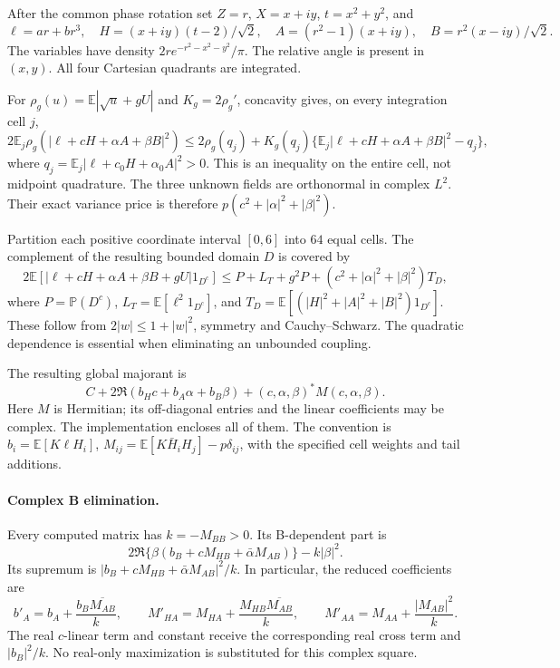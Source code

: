After the common phase rotation set $Z=r$, $X=x+iy$, $t=x^2+y^2$, and
\[
 \ell=ar+br^3,\quad H=(x+iy)(t-2)/\sqrt2,\quad
 A=(r^2-1)(x+iy),\quad B=r^2(x-iy)/\sqrt2.
\]
The variables have density $2r e^{-r^2-x^2-y^2}/\pi$.
The relative angle is present in $(x,y)$. All four Cartesian quadrants
are integrated.

For $\rho_g(u)=\mathbb E|\sqrt u+gU|$ and $K_g=2\rho_g'$, concavity gives,
on every integration cell $j$,
\[
 2\mathbb E_j\rho_g(|\ell+cH+\alpha A+\beta B|^2)
 \le2\rho_g(q_j)+K_g(q_j)
 \{\mathbb E_j|\ell+cH+\alpha A+\beta B|^2-q_j\},
\]
where $q_j=\mathbb E_j|\ell+c_0H+\alpha_0A|^2>0$.
This is an inequality on the entire cell, not midpoint quadrature.
The three unknown fields are orthonormal in complex $L^2$.
Their exact variance price is therefore $p(c^2+|\alpha|^2+|\beta|^2)$.

Partition each positive coordinate interval $[0,6]$ into $64$ equal
cells. The complement of the resulting bounded domain $D$ is covered by
\[
 2\mathbb E[|\ell+cH+\alpha A+\beta B+gU|1_{D^c}]
 \le P+L_T+g^2P+(c^2+|\alpha|^2+|\beta|^2)T_D,
\]
where $P=\mathbb P(D^c)$, $L_T=\mathbb E[\ell^2 1_{D^c}]$, and
$T_D=\mathbb E[(|H|^2+|A|^2+|B|^2)1_{D^c}]$.
These follow from $2|w|\le1+|w|^2$, symmetry and Cauchy--Schwarz.
The quadratic dependence is essential when eliminating an unbounded
coupling.

The resulting global majorant is
\[
 C+2\Re(b_Hc+b_A\alpha+b_B\beta)
 +(c,\alpha,\beta)^*M(c,\alpha,\beta).
\]
Here $M$ is Hermitian; its off-diagonal entries and the linear
coefficients may be complex. The implementation encloses all of them.
The convention is
$b_i=\mathbb E[K\ell H_i]$, $M_{ij}=\mathbb E[K\bar H_iH_j]-p\delta_{ij}$,
with the specified cell weights and tail additions.

\paragraph{Complex B elimination.}
Every computed matrix has $k=-M_{BB}>0$. Its B-dependent part is
\[
 2\Re\{\beta(b_B+cM_{HB}+\bar\alpha M_{AB})\}-k|\beta|^2.
\]
Its supremum is
$|b_B+cM_{HB}+\bar\alpha M_{AB}|^2/k$.
In particular, the reduced coefficients are
\[
 b'_A=b_A+\frac{b_B\overline{M_{AB}}}{k},
 \qquad
 M'_{HA}=M_{HA}+\frac{M_{HB}\overline{M_{AB}}}{k},
 \qquad
 M'_{AA}=M_{AA}+\frac{|M_{AB}|^2}{k}.
\]
The real $c$-linear term and constant receive the corresponding real
cross term and $|b_B|^2/k$. No real-only maximization is substituted for
this complex square.

